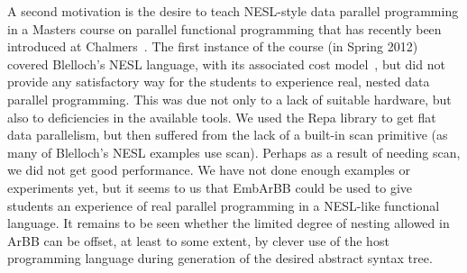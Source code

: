 A second motivation is the desire to teach NESL-style data parallel programming
in a Masters course on parallel functional programming that has recently been
introduced at Chalmers~. The first instance of the course (in Spring 2012)
covered Blelloch's NESL language, with its
associated cost model~, but did not provide any satisfactory way for the students
to experience real, nested data parallel programming. This was due not only to a lack of suitable hardware, but also to deficiencies in the available tools.
We used the Repa library to get flat data parallelism, but then suffered from
the lack of a built-in scan primitive (as many of Blelloch's NESL examples use scan). Perhaps as a result
of needing scan, we did not get good performance.
We have not done enough examples or experiments yet, but it seems to us that EmbArBB
could be used to give students an experience of real parallel programming in a NESL-like
functional language. It remains to be seen whether the limited degree of nesting allowed in ArBB can be offset, at least to some extent, by clever use of the host programming language during generation of the desired abstract syntax tree.

